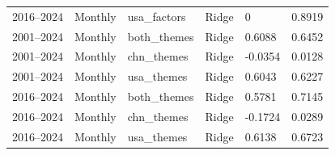 \begin{table}[htbp]
\begin{tabular}{@{}lllllr@{}}
2016--2024  & Monthly     & usa\_factors   & Ridge          & 0         & 0.8919 \\
2001--2024  & Monthly     & both\_themes   & Ridge          & 0.6088         & 0.6452 \\
2001--2024  & Monthly     & chn\_themes    & Ridge          & -0.0354        & 0.0128 \\
2001--2024  & Monthly     & usa\_themes    & Ridge          & 0.6043         & 0.6227 \\
2016--2024  & Monthly     & both\_themes   & Ridge          & 0.5781         & 0.7145 \\
2016--2024  & Monthly     & chn\_themes    & Ridge          & -0.1724        & 0.0289 \\
2016--2024  & Monthly     & usa\_themes    & Ridge          & 0.6138         & 0.6723 \\ \bottomrule
\end{tabular}
\end{table}


